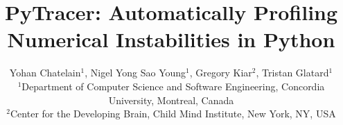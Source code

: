 \documentclass[10pt,journal,compsoc]{IEEEtran}
\begin{document}
\makeatletter
\let\orig@lstnumber=\thelstnumber
\newcommand\lstsetnumber[1]{\gdef\thelstnumber{#1}}
\newcommand\lstresetnumber{\global\let\thelstnumber=\orig@lstnumber}
\makeatother

%
\title{PyTracer: Automatically Profiling Numerical Instabilities in Python}
%
%
%
%

\author{Yohan Chatelain$^1$, Nigel Yong Sao Young$^1$,  Gregory Kiar$^2$,  Tristan Glatard$^1$\\
    $^1$Department of Computer Science and Software Engineering, Concordia University, Montreal, Canada\\
    $^2$Center for the Developing Brain, Child Mind Institute, New York, NY, USA}
\end{document}
